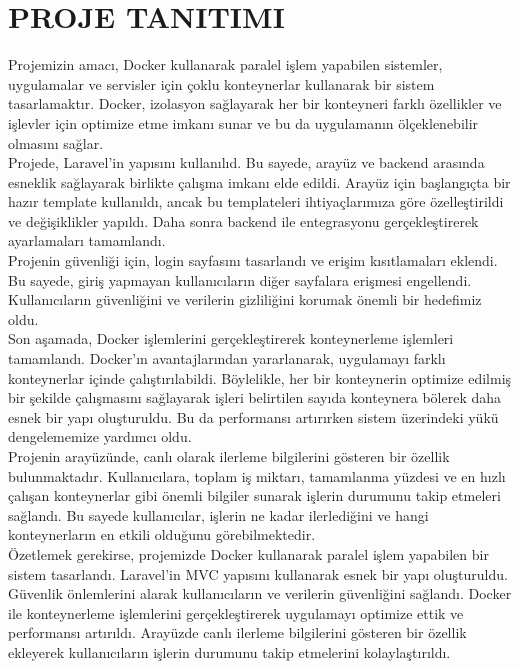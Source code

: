 \section{PROJE TANITIMI }
Projemizin amacı, Docker kullanarak paralel işlem yapabilen sistemler, uygulamalar ve servisler için çoklu konteynerlar kullanarak bir sistem tasarlamaktır. Docker, izolasyon sağlayarak her bir konteyneri farklı özellikler ve işlevler için optimize etme imkanı sunar ve bu da uygulamanın ölçeklenebilir olmasını sağlar.\\
Projede, Laravel'in yapısını kullanılıd. Bu sayede, arayüz ve backend arasında esneklik sağlayarak birlikte çalışma imkanı elde edildi. Arayüz için başlangıçta bir hazır template kullanıldı, ancak bu templateleri ihtiyaçlarımıza göre özelleştirildi ve değişiklikler yapıldı. Daha sonra backend ile entegrasyonu gerçekleştirerek ayarlamaları tamamlandı.\\
Projenin güvenliği için, login sayfasını tasarlandı ve erişim kısıtlamaları eklendi. Bu sayede, giriş yapmayan kullanıcıların diğer sayfalara erişmesi engellendi. Kullanıcıların güvenliğini ve verilerin gizliliğini korumak önemli bir hedefimiz oldu.\\
Son aşamada, Docker işlemlerini gerçekleştirerek konteynerleme işlemleri tamamlandı. Docker'ın avantajlarından yararlanarak, uygulamayı farklı konteynerlar içinde çalıştırılabildi. Böylelikle, her bir konteynerin optimize edilmiş bir şekilde çalışmasını sağlayarak işleri belirtilen sayıda konteynera bölerek daha esnek bir yapı oluşturuldu. Bu da performansı artırırken sistem üzerindeki yükü dengelememize yardımcı oldu.\\
Projenin arayüzünde, canlı olarak ilerleme bilgilerini gösteren bir özellik bulunmaktadır. Kullanıcılara, toplam iş miktarı, tamamlanma yüzdesi ve en hızlı çalışan konteynerlar gibi önemli bilgiler sunarak işlerin durumunu takip etmeleri sağlandı. Bu sayede kullanıcılar, işlerin ne kadar ilerlediğini ve hangi konteynerların en etkili olduğunu görebilmektedir.\\
Özetlemek gerekirse, projemizde Docker kullanarak paralel işlem yapabilen bir sistem tasarlandı. Laravel'in MVC yapısını kullanarak esnek bir yapı oluşturuldu. Güvenlik önlemlerini alarak kullanıcıların ve verilerin güvenliğini sağlandı. Docker ile konteynerleme işlemlerini gerçekleştirerek uygulamayı optimize ettik ve performansı artırıldı. Arayüzde canlı ilerleme bilgilerini gösteren bir özellik ekleyerek kullanıcıların işlerin durumunu takip etmelerini kolaylaştırıldı.\\
